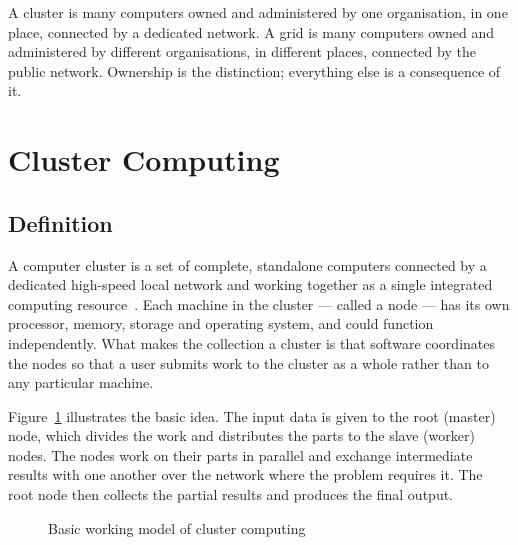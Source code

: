 \begin{notebox}
A cluster is many computers owned and administered by one organisation, in
one place, connected by a dedicated network. A grid is many computers owned
and administered by different organisations, in different places, connected
by the public network. Ownership is the distinction; everything else is a
consequence of it.
\end{notebox}


\section{Cluster Computing}

\subsection{Definition}

A computer cluster is a set of complete, standalone computers connected by a
dedicated high-speed local network and working together as a single
integrated computing resource~. Each machine in the cluster --- called a
node --- has its own processor, memory, storage and operating system, and
could function independently. What makes the collection a cluster is that
software coordinates the nodes so that a user submits work to the cluster as
a whole rather than to any particular machine.

Figure~\ref{fig:basic} illustrates the basic idea. The input data is given to
the root (master) node, which divides the work and distributes the parts to
the slave (worker) nodes. The nodes work on their parts in parallel and
exchange intermediate results with one another over the network where the
problem requires it. The root node then collects the partial results and
produces the final output.

\begin{figure}[!htb]
\centering
{}
\caption{Basic working model of cluster computing}
\label{fig:basic}
\end{figure}

